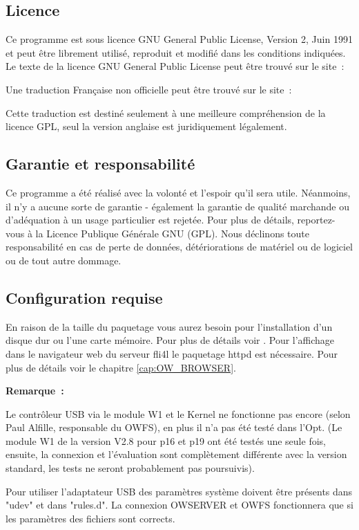 \subsection{Licence}
Ce programme est sous licence GNU General Public License, Version 2, Juin 1991 et
peut être librement utilisé, reproduit et modifié dans les conditions indiquées.
Le texte de la licence GNU General Public License peut être trouvé sur le site~:

Une traduction Française non officielle peut être trouvé sur le site~:

Cette traduction est destiné seulement à une meilleure compréhension de
la licence GPL, seul la version anglaise est juridiquement légalement.

\subsection{Garantie et responsabilité}
Ce programme a été réalisé avec la volonté et l'espoir qu'il sera utile.
Néanmoins, il n'y a aucune sorte de garantie - également la garantie de qualité
marchande ou d'adéquation à un usage particulier est rejetée. Pour plus de détails,
reportez-vous à la Licence Publique Générale GNU (GPL). Nous déclinons toute
responsabilité en cas de perte de données, détériorations de matériel ou de logiciel
ou de tout autre dommage.

\subsection{Configuration requise}
En raison de la taille du paquetage  vous aurez besoin pour l'installation
d'un disque dur ou l'une carte mémoire. Pour plus de détails voir .
Pour l'affichage dans le navigateur web du serveur fli4l le paquetage \flqq{}httpd\frqq{}
est nécessaire. Pour plus de détails voir le chapitre \ref{cap:OW_BROWSER}.

\textbf{Remarque~:}

Le contrôleur USB via le module W1 et le Kernel ne fonctionne pas encore (selon
Paul Alfille, responsable du OWFS), en plus il n'a pas été testé dans l'Opt. (Le module
W1 de la version V2.8 pour p16 et p19 ont été testés une seule fois, ensuite,
la connexion et l'évaluation sont complètement différente avec la version
standard, les tests ne seront probablement pas poursuivis).

Pour utiliser l'adaptateur USB des paramètres système doivent être présents dans
"udev" et dans "rules.d". La connexion OWSERVER et OWFS fonctionnera que si les
paramètres des fichiers sont corrects.

